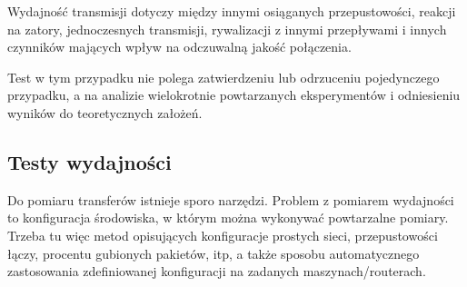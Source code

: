 \documentclass[a4paper,11pt]{mwart}
\begin{document}
Wydajność transmisji dotyczy między innymi osiąganych przepustowości, reakcji na
zatory, jednoczesnych transmisji, rywalizacji z innymi przepływami i innych
czynników mających wpływ na odczuwalną jakość połączenia.

Test w tym przypadku nie polega zatwierdzeniu lub odrzuceniu pojedynczego
przypadku, a na analizie wielokrotnie powtarzanych eksperymentów i odniesieniu
wyników do teoretycznych założeń.

\subsection{Testy wydajności}

Do pomiaru transferów istnieje sporo narzędzi. Problem z pomiarem
wydajności to konfiguracja środowiska, w którym można wykonywać
powtarzalne pomiary. Trzeba tu więc metod opisujących konfiguracje
prostych sieci, przepustowości łączy, procentu gubionych pakietów, itp,
a także sposobu automatycznego zastosowania zdefiniowanej konfiguracji
na zadanych maszynach/routerach.
\end{document}
